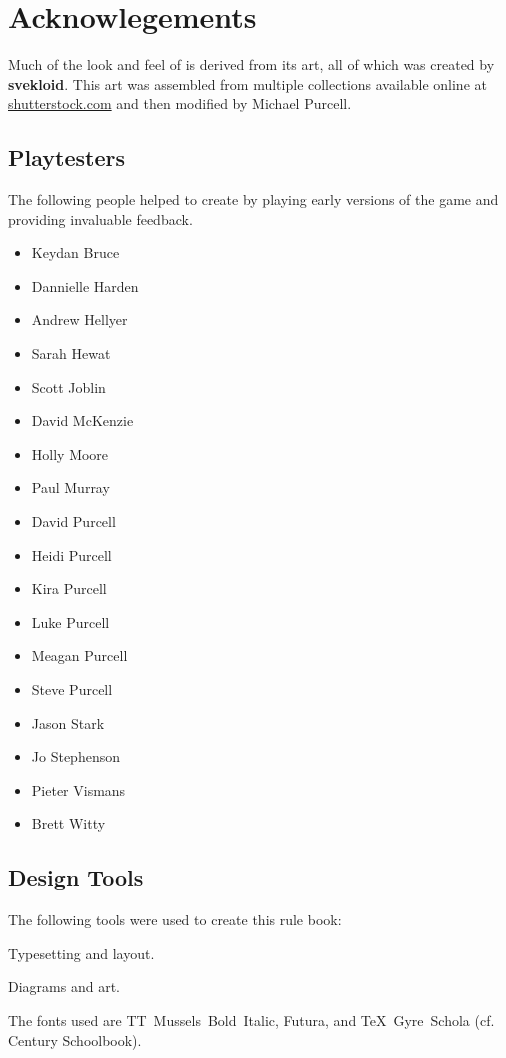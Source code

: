 \documentclass[11pt, a5paper, parskip=half-, DIV=12]{scrartcl}
\begin{document}
\setcounter{page}{1}
\setmainfont{TeX Gyre Schola}
\normalsize
\raggedright

\section*{Acknowlegements}
Much of the look and feel of \ENDEAVOUR{} is derived from its art, all of which was created by \textbf{svekloid}. This art was assembled from multiple collections available online at \href{http://shutterstock.com}{shutterstock.com} and then modified by Michael Purcell.  

\subsection*{Playtesters} \label{subsection:playtesters}
The following people helped to create \ENDEAVOUR{} by playing early versions of the game and providing invaluable feedback.\vspace{-1.75ex}
\begin{multicols}{2}
\begin{itemize}[noitemsep]
  \item Keydan Bruce
  \item Dannielle Harden
  \item Andrew Hellyer
  \item Sarah Hewat
  \item Scott Joblin
  \item David McKenzie
  \item Holly Moore
  \item Paul Murray
  \item David Purcell
  \item Heidi Purcell
  \item Kira Purcell
  \item Luke Purcell
  \item Meagan Purcell
  \item Steve Purcell
  \item Jason Stark
  \item Jo Stephenson
  \item Pieter Vismans
  \item Brett Witty
\end{itemize}
\end{multicols}

\subsection*{Design Tools} \label{subsection:design-tools}
The following tools were used to create this rule book:
\begin{description}[font=\normalfont\textbullet\space, noitemsep, topsep=-1ex]
	\item[LuaLaTeX:] Typesetting and layout.
	\item[TikZ:] Diagrams and art.
\end{description}
\vspace{1ex}
The fonts used are {\setmainfont{TT Mussels-BoldItalic} TT~Mussels~Bold~Italic},  \textsf{Futura}, and TeX~Gyre~Schola (cf. Century Schoolbook).
\end{document}
